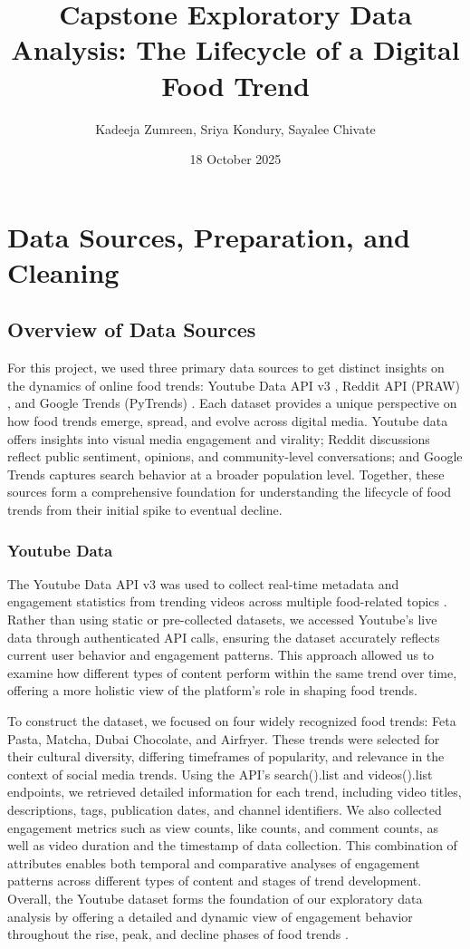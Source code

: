\documentclass{article}
\title{Capstone Exploratory Data Analysis: The Lifecycle of a Digital Food Trend}
\author{Kadeeja Zumreen, Sriya Kondury, Sayalee Chivate}
\date{18 October 2025}
\begin{document}
\maketitle

\section{Data Sources, Preparation, and Cleaning}
\subsection{Overview of Data Sources}
For this project, we used three primary data sources to get distinct insights on the dynamics of online food trends: Youtube Data API v3 \citep{youtube_api}, Reddit API (PRAW) \citep{reddit_api_praw}, and Google Trends (PyTrends) \citep{pytrends_api}. Each dataset provides a unique perspective on how food trends emerge, spread, and evolve across digital media. Youtube data offers insights into visual media engagement and virality; Reddit discussions reflect public sentiment, opinions, and community-level conversations; and Google Trends captures search behavior at a broader population level. Together, these sources form a comprehensive foundation for understanding the lifecycle of food trends from their initial spike to eventual decline. 

\subsubsection{Youtube Data}
The Youtube Data API  v3 was used to collect real-time metadata and engagement statistics from trending videos across multiple food-related topics \citep{youtube_api}. Rather than using static or pre-collected datasets, we accessed Youtube's live data through authenticated API calls, ensuring the dataset accurately reflects current user behavior and engagement patterns. This approach allowed us to examine how different types of content perform within the same trend over time, offering a more holistic view of the platform's role in shaping food trends. 

To construct the dataset, we focused on four widely recognized food trends: Feta Pasta, Matcha, Dubai Chocolate, and Airfryer. These trends were selected for their cultural diversity, differing timeframes of popularity, and relevance in the context of social media trends. Using the API's search().list and videos().list endpoints, we retrieved detailed information for each trend, including video titles, descriptions, tags, publication dates, and channel identifiers. We also collected engagement metrics such as view counts, like counts, and comment counts, as well as video duration and the timestamp of data collection. This combination of attributes enables both temporal and comparative analyses of engagement patterns across different types of content and stages of trend development. Overall, the Youtube dataset forms the foundation of our exploratory data analysis by offering a detailed and dynamic view of engagement behavior throughout the rise, peak, and decline phases of food trends \citep{youtube_api}.
\end{document}
